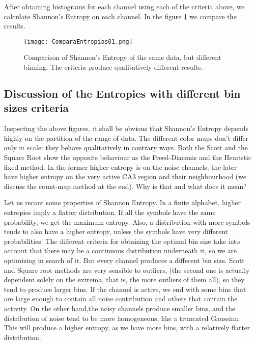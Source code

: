 \documentclass{article}
\begin{document}
After obtaining histograms for each channel using each of the criteria above, we
calculate Shannon's Entropy on each channel. In the figure \ref{entrocomp} we compare
the results. 
\begin{figure}
  \texttt{[image: ComparaEntropias01.png]}
  \caption{Comparison of Shannon's Entropy of the same data, but
    different binning. The criteria produce qualitatively different results.}
  \label{entrocomp}
\end{figure}


\subsection{Discussion of the Entropies with different bin sizes criteria}

Inspecting the above figures, it shall be obvious that Shannon's Entropy depends highly on the partition of the range of data. The different color maps don't differ only in scale: they behave qualitatively in contrary ways. Both the Scott and the Square Root show the opposite behaviour as the Freed-Diaconis and the Heuristic fixed method. In the former higher entropy is on the noise channels, the later have higher entropy on the very active CA3 region and their neighbourhood (we discuss the count-map method at the end). Why is that and what does it mean?

Let us recant some properties of Shannon Entropy. In a finite alphabet, higher entropies imply a flatter distribution. If all the symbols have the same probability, we get the maximum entropy. Also, a distribution with more symbols tends to also have a higher entropy, unless the symbols have very different probabilities. The different criteria for obtaining the optimal bin size take into account that there may be a continuous distribution underneath it, so we are optimizing in search of it. But every channel produces a different bin size. Scott and Square root methods are very sensible to outliers, (the second one is actually dependent solely on the extrema, that is, the more outliers of them all), so they tend to produce larger bins. If the channel is active, we end with some bins that are large enough to contain all noise contribution and others that contain the activity. On the other hand,the noisy channels produce smaller bins, and the distribution of noise tend to be more homogeneous, like a truncated Gaussian. This will produce a higher entropy, as we have more bins, with a relatively flatter distribution.
\end{document}
